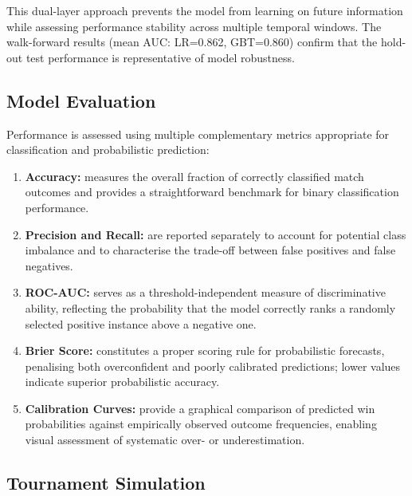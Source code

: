 \documentclass[12pt,a4paper,onecolumn]{article}
\begin{document}
This dual-layer approach prevents the model from learning on future information while assessing performance stability across multiple temporal windows. The walk-forward results (mean AUC: LR=0.862, GBT=0.860) confirm that the hold-out test performance is representative of model robustness.

\subsection{Model Evaluation}

Performance is assessed using multiple complementary metrics appropriate for classification and probabilistic prediction:

\vspace{0.25cm}

\begin{enumerate}[label=\textbf{\arabic*.}, leftmargin=1.5cm, itemsep=0.25em, parsep=0.5em]

\item \textbf{Accuracy:} measures the overall fraction of correctly classified match outcomes and provides a straightforward benchmark for binary classification performance.

\item \textbf{Precision and Recall:} are reported separately to account for potential class imbalance and to characterise the trade-off between false positives and false negatives.

\item \textbf{ROC-AUC:} serves as a threshold-independent measure of discriminative ability, reflecting the probability that the model correctly ranks a randomly selected positive instance above a negative one. \cite{Hanley1982}

\item \textbf{Brier Score:} constitutes a proper scoring rule for probabilistic forecasts, penalising both overconfident and poorly calibrated predictions; lower values indicate superior probabilistic accuracy. \cite{Brier1950}

\item \textbf{Calibration Curves:} provide a graphical comparison of predicted win probabilities against empirically observed outcome frequencies, enabling visual assessment of systematic over- or underestimation. \cite{Guo2017}
\end{enumerate}

\subsection{Tournament Simulation}
\end{document}
